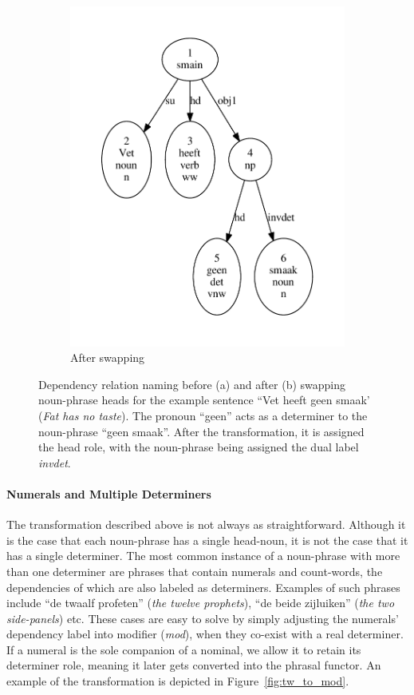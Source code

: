 \begin{figure}[t]
\begin{subfigure}{0.49\textwidth}
        \includegraphics[scale=0.48]{Figures/invdet2.pdf}
        \caption{After swapping}
    \end{subfigure}
    \caption[Noun-Phrase Head Swapping]{Dependency relation naming before (a) and after (b) swapping noun-phrase heads for the example sentence ``Vet heeft geen smaak' (\textit{Fat has no taste}). The pronoun ``geen'' acts as a determiner to the noun-phrase ``geen smaak''. After the transformation, it is assigned the head role, with the noun-phrase being assigned the dual label \textit{invdet}.}
    \label{fig:invdet}
\end{figure}

\paragraph{Numerals and Multiple Determiners}
The transformation described above is not always as straightforward.
Although it is the case that each noun-phrase has a single head-noun, it is not the case that it has a single determiner.
The most common instance of a noun-phrase with more than one determiner are phrases that contain numerals and count-words, the dependencies of which are also labeled as determiners.
Examples of such phrases include ``de twaalf profeten'' (\textit{the twelve prophets}), ``de beide zijluiken'' (\textit{the two side-panels}) etc. 
These cases are easy to solve by simply adjusting the numerals' dependency label into modifier (\textit{mod}), when they co-exist with a real determiner.
If a numeral is the sole companion of a nominal, we allow it to retain its determiner role, meaning it later gets converted into the phrasal functor.
An example of the transformation is depicted in Figure~\ref{fig:tw_to_mod}.

